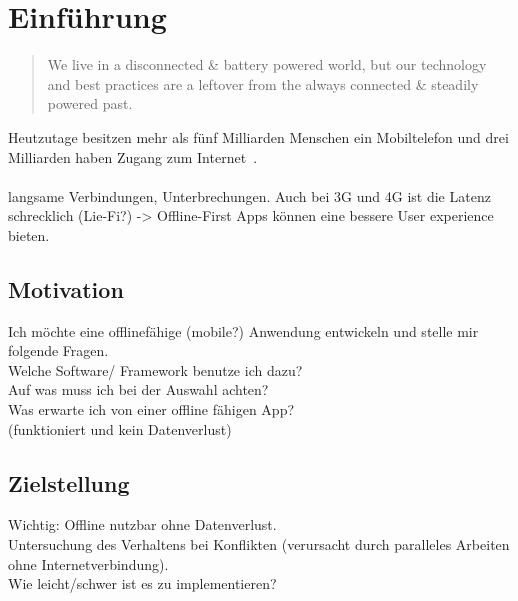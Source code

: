 \chapter{\label{chap:einleitung}Einführung}
\begin{quote}
  We live in a disconnected \& battery powered world, but our technology and best practices are a leftover from the always connected \& steadily powered past.
  \cite{offlinefirst}
\end{quote}

Heutzutage besitzen mehr als fünf Milliarden Menschen ein Mobiltelefon und drei Milliarden haben Zugang zum Internet~\cite{dev-report}.\\\\

langsame Verbindungen, Unterbrechungen. Auch bei 3G und 4G ist die Latenz schrecklich (Lie-Fi?) -> Offline-First Apps können eine bessere User experience bieten.

\section{Motivation}
Ich möchte eine offlinefähige (mobile?) Anwendung entwickeln und stelle mir folgende Fragen. \\
Welche Software/ Framework benutze ich dazu?\\
Auf was muss ich bei der Auswahl achten?\\
Was erwarte ich von einer offline fähigen App?\\
(funktioniert und kein Datenverlust)
\section{Zielstellung}
Wichtig: Offline nutzbar ohne Datenverlust.\\
Untersuchung des Verhaltens bei  Konflikten (verursacht durch paralleles Arbeiten ohne Internetverbindung).\\
Wie leicht/schwer ist es zu implementieren?
